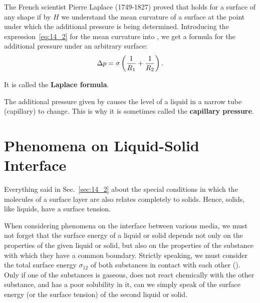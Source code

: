 The French scientist Pierre Laplace (1749-1827) proved that  holds for a surface of any shape if by $H$ we understand the mean curvature of a surface at the point under which the additional pressure is being determined. Introducing the expression~\eqref{eq:14_2} for the mean curvature into , we get a formula for the additional pressure under an arbitrary surface:
\begin{equation}\label{eq:14_4}
	\Delta p = \sigma\left(\frac{1}{R_1} + \frac{1}{R_2}\right).
\end{equation}

\noindent
It is called the \textbf{Laplace formula}.

The additional pressure given by  causes the level of a liquid in a narrow tube (capillary) to change. This is why it is sometimes called the \textbf{capillary pressure}.

\section{Phenomena on Liquid-Solid Interface}\label{sec:14_4}

Everything said in Sec.~\ref{sec:14_2} about the special conditions in which the molecules of a surface layer are also relates completely to solids. Hence, solids, like liquids, have a surface tension.

When considering phenomena on the interface between various media, we must not forget that the surface energy of a liquid or solid depends not only on the properties of the given liquid or solid, but also on the properties of the substance with which they have a common boundary. Strictly speaking, we must consider the total surface energy $\sigma_{12}$ of both substances in contact with each other (). Only if one of the substances is gaseous, does not react chemically with the other substance, and has a poor solubility in it, can we simply speak of the surface energy (or the surface tension) of the second liquid or solid.

